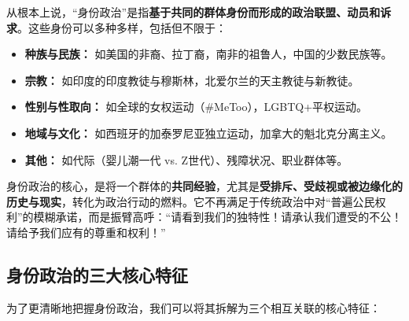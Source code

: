 从根本上说，“身份政治”是指\textbf{基于共同的群体身份而形成的政治联盟、动员和诉求}。这些身份可以多种多样，包括但不限于：
\begin{itemize}
    \item \textbf{种族与民族：} 如美国的非裔、拉丁裔，南非的祖鲁人，中国的少数民族等。
    \item \textbf{宗教：} 如印度的印度教徒与穆斯林，北爱尔兰的天主教徒与新教徒。
    \item \textbf{性别与性取向：} 如全球的女权运动（\#MeToo），LGBTQ+平权运动。
    \item \textbf{地域与文化：} 如西班牙的加泰罗尼亚独立运动，加拿大的魁北克分离主义。
    \item \textbf{其他：} 如代际（婴儿潮一代 vs. Z世代）、残障状况、职业群体等。
\end{itemize}

身份政治的核心，是将一个群体的\textbf{共同经验}，尤其是\textbf{受排斥、受歧视或被边缘化的历史与现实}，转化为政治行动的燃料。它不再满足于传统政治中对“普遍公民权利”的模糊承诺，而是振臂高呼：“请看到我们的独特性！请承认我们遭受的不公！请给予我们应有的尊重和权利！”

\subsection{身份政治的三大核心特征}

为了更清晰地把握身份政治，我们可以将其拆解为三个相互关联的核心特征：

